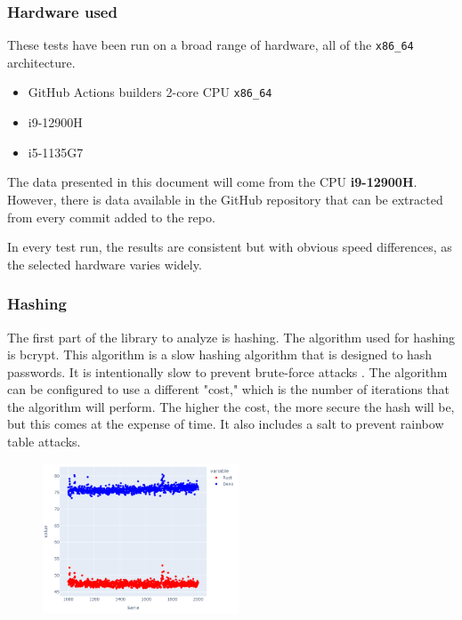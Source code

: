 \documentclass[10pt,journal,compsoc]{IEEEtran}
\begin{document}
\subsubsection{Hardware used}

These tests have been run on a broad range of hardware, all of the \verb|x86_64| architecture.

\begin{itemize}
    \item GitHub Actions builders 2-core CPU \verb|x86_64| \cite{Github}
    \item i9-12900H
    \item i5-1135G7
\end{itemize}

The data presented in this document will come from the CPU \textbf{i9-12900H}. However, there is data available in the GitHub repository that can be extracted from every commit added to the repo.

In every test run, the results are consistent but with obvious speed differences, as the selected hardware varies widely.

\subsubsection{Hashing}

The first part of the library to analyze is hashing. The algorithm used for hashing is bcrypt. This algorithm is a slow hashing algorithm that is designed to hash passwords. It is intentionally slow to prevent brute-force attacks \cite{Bcrypt}. The algorithm can be configured to use a different "cost," which is the number of iterations that the algorithm will perform. The higher the cost, the more secure the hash will be, but this comes at the expense of time. It also includes a salt to prevent rainbow table attacks.

\begin{figure}[H]
    \centering
    \includegraphics[width=0.52\textwidth]{hashing_lines}
\end{figure}
\end{document}

